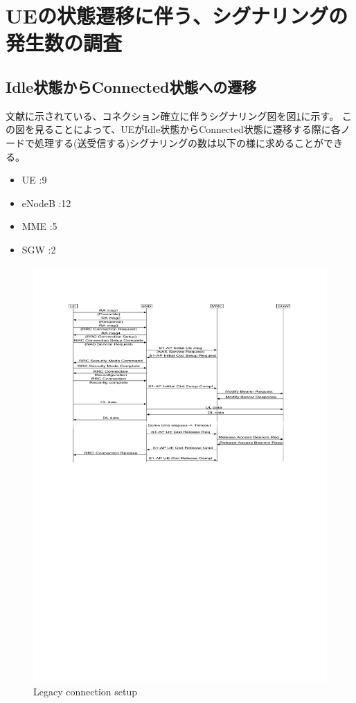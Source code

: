 \documentclass[a4j]{ujarticle}
\begin{document}
\section{UEの状態遷移に伴う、シグナリングの発生数の調査}
\subsection{Idle状態からConnected状態への遷移}
文献\cite{3gpp.23.720}に示されている、コネクション確立に伴うシグナリング図を図\ref{Legacy_connection_setup}に示す。
この図を見ることによって、UEがIdle状態からConnected状態に遷移する際に各ノードで処理する(送受信する)シグナリングの数は以下の様に求めることができる。
\begin{itemize}
  \item UE      :9
  \item eNodeB  :12
  \item MME     :5
  \item SGW     :2
\end{itemize}
\begin{figure}[htbp]
  \centering
  \includegraphics[width=0.9\hsize]{Legacy_connection_setup.pdf}
  \caption{Legacy connection setup}
  \label{Legacy_connection_setup}
\end{figure}
\clearpage
\end{document}
